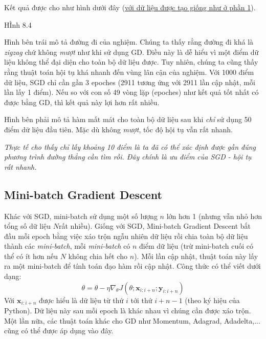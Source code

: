 Kết quả được cho như hình dưới đây (\href{http://machinelearningcoban.com/2017/01/12/gradientdescent/#quay-lai-voi-bai-toan-linear-regression}{với dữ liệu được tạo giống như ở phần 1}). 
 
{\color{red} HÌnh 8.4} 
 
Hình bên trái mô tả đường đi của nghiệm. Chúng ta thấy rằng đường đi khá là \textit{zigzag} chứ không \textit{mượt} như khi sử dụng GD. Điều này là dễ hiểu vì một điểm dữ liệu không thể đại diện cho toàn bộ dữ liệu được. Tuy nhiên, chúng ta cũng thấy rằng thuật toán hội tụ khá nhanh đến vùng lân cận của nghiệm. Với 1000 điểm dữ liệu, SGD chỉ cần gần 3 epoches (2911 tương ứng với 2911 lần cập nhật, mỗi lần lấy 1 điểm). Nếu so với con số 49 vòng lặp (epoches) như kết quả tốt nhất có được bằng GD, thì kết quả này lợi hơn rất nhiều.  
 
Hình bên phải mô tả hàm mất mát cho toàn bộ dữ liệu sau khi \textit{chỉ} sử dụng 50 điểm dữ liệu đầu tiên. Mặc dù không \textit{mượt}, tốc độ hội tụ vẫn rất nhanh.  
 
\textit{Thực tế cho thấy chỉ lấy khoảng 10 điểm là ta đã có thể xác định được gần đúng phương trình đường thẳng cần tìm rồi. Đây chính là ưu điểm của SGD - hội tụ rất nhanh.} 
 
 
\subsection{Mini-batch Gradient Descent}
Khác với SGD, mini-batch sử dụng một số lượng $n$ lớn hơn 1 (nhưng vẫn nhỏ hơn tổng số dữ liệu $N$rất nhiều). Giống với SGD, Mini-batch Gradient Descent bắt đầu mỗi epoch bằng việc xáo trộn ngẫu nhiên dữ liệu rồi chia toàn bộ dữ liệu thành các \textit{mini-batch}, mỗi \textit{mini-batch} có $n$ điểm dữ liệu (trừ mini-batch cuối có thể có ít hơn nếu $N$ không chia hết cho $n$). Mỗi lần cập nhật, thuật toán này lấy ra một mini-batch để tính toán đạo hàm rồi cập nhật. Công thức có thể viết dưới dạng: 
\begin{equation} 
\theta = \theta - \eta\nabla_{\theta} J(\theta; \mathbf{x}_{i:i+n}; \mathbf{y}_{i:i+n}) 
\end{equation} 
Với $\mathbf{x}_{i:i+n}$ được hiểu là dữ liệu từ thứ $i$ tới thứ $i+n-1$ (theo ký hiệu của Python). Dữ liệu này sau mỗi epoch là khác nhau vì chúng cần được xáo trộn. Một lần nữa, các thuật toán khác cho GD như Momentum, Adagrad, Adadelta,... cũng có thể được áp dụng vào đây. 
 
